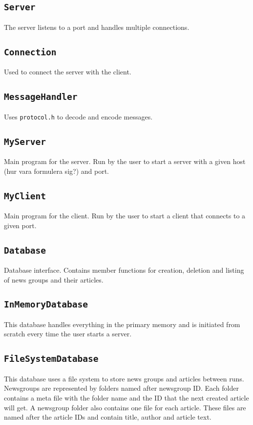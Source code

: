 \documentclass{article}
\begin{document}
\subsection{\texttt{Server}}
The server listens to a port and handles multiple connections.

\subsection{\texttt{Connection}}
Used to connect the server with the client. 

\subsection{\texttt{MessageHandler}}
Uses \texttt{protocol.h} to decode and encode messages.

\subsection{\texttt{MyServer}}
Main program for the server. Run by the user to start a server with a given host (hur vara formulera sig?) and port.

\subsection{\texttt{MyClient}}
Main program for the client. Run by the user to start a client that connects to a given port. 

\subsection{\texttt{Database}}
Database interface. Contains member functions for creation, deletion and listing of news groups and their articles. 

\subsection{\texttt{InMemoryDatabase}}
This database handles everything in the primary memory and is initiated from scratch every time the user starts a server.

\subsection{\texttt{FileSystemDatabase}}
This database uses a file system to store news groups and articles between runs. Newsgroups are represented by folders named after newsgroup ID. Each folder contains a meta file with the folder name and the ID that the next created article will get. A newsgroup folder also contains one file for each article. These files are named after the article IDs and contain title, author and article text. 
\end{document}
